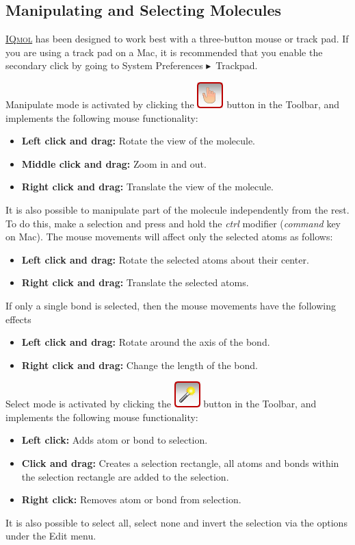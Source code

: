 \documentclass[a4paper,12pt]{article}
\newcommand{\iqmol}{\href{http://iqmol.org}{{\scshape IQmol}}}
\newcommand{\bt}{\ensuremath{\blacktriangleright}}
\begin{document}
\subsection{Manipulating and Selecting Molecules}
\label{sec:mousemodes}

\iqmol{} has been designed to work best with a three-button mouse or track pad.
If you are using a track pad on a  Mac, it is recommended that you enable the
secondary click by going to System Preferences \bt\ Trackpad.

Manipulate mode is activated by clicking the
\includegraphics[scale=0.40]{figures/ManipulateButton.png} button in the
Toolbar, and implements the following mouse functionality:
\begin{itemize}
\item {\bf Left click and drag:} Rotate the view of the molecule.  
\item {\bf Middle click and drag:} Zoom in and out.  
\item {\bf Right click and drag:} Translate the view of the molecule.
\end{itemize}

It is also possible to manipulate part of the molecule independently from the
rest.  To do this, make a selection and press and hold the \emph{ctrl} modifier
(\emph{command} key on Mac).  The mouse movements will affect only the 
selected atoms as follows:
\begin{itemize}
\item {\bf Left click and drag:} Rotate the selected atoms about their center. 
\item {\bf Right click and drag:} Translate the selected atoms.  
\end{itemize}
If only a single bond is selected, then the mouse movements have the following effects
\begin{itemize}
\item {\bf Left click and drag:} Rotate around the axis of the bond.
\item {\bf Right click and drag:} Change the length of the bond.
\end{itemize}

Select mode is activated by clicking the
\includegraphics[scale=0.40]{figures/SelectButton.png} button in the Toolbar,
and implements the following mouse functionality:
\begin{itemize}
\item {\bf Left click:} Adds atom or bond to selection. 
\item {\bf Click and drag:} Creates a selection rectangle, all atoms and bonds
           within the selection rectangle are added to the selection. 
\item {\bf Right click:}  Removes atom or bond from selection.
\end{itemize}
It is also possible to select all, select none and invert the selection via
the options under the Edit menu.
\end{document}
